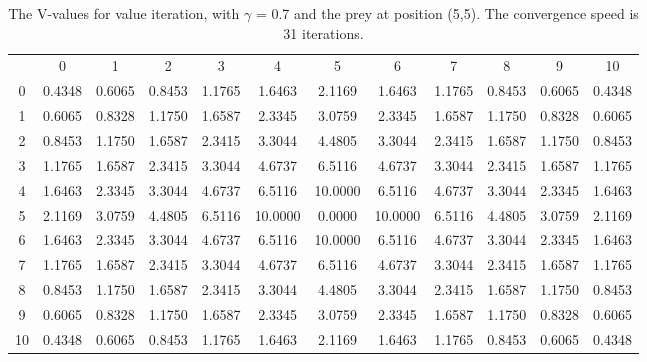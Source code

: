 \documentclass{article}
\begin{document}
\begin{landscape}
\begin{table}[tbp]
\centering
\begin{tabular} {c c c c c c c c c c c c}
 & 0 & 1 & 2 & 3 & 4 & 5 & 6 & 7 & 8 & 9 & 10 \\
0 &  0.4348 &  0.6065 &  0.8453 &  1.1765 &  1.6463 &  2.1169 &  1.6463 &  1.1765 &  0.8453 &  0.6065 &  0.4348\\
1 &  0.6065 &  0.8328 &  1.1750 &  1.6587 &  2.3345 &  3.0759 &  2.3345 &  1.6587 &  1.1750 &  0.8328 &  0.6065\\
2 &  0.8453 &  1.1750 &  1.6587 &  2.3415 &  3.3044 &  4.4805 &  3.3044 &  2.3415 &  1.6587 &  1.1750 &  0.8453\\
3 &  1.1765 &  1.6587 &  2.3415 &  3.3044 &  4.6737 &  6.5116 &  4.6737 &  3.3044 &  2.3415 &  1.6587 &  1.1765\\
4 &  1.6463 &  2.3345 &  3.3044 &  4.6737 &  6.5116 & 10.0000 &  6.5116 &  4.6737 &  3.3044 &  2.3345 &  1.6463\\
5 &  2.1169 &  3.0759 &  4.4805 &  6.5116 & 10.0000 &  0.0000 & 10.0000 &  6.5116 &  4.4805 &  3.0759 &  2.1169\\
6 &  1.6463 &  2.3345 &  3.3044 &  4.6737 &  6.5116 & 10.0000 &  6.5116 &  4.6737 &  3.3044 &  2.3345 &  1.6463\\
7 &  1.1765 &  1.6587 &  2.3415 &  3.3044 &  4.6737 &  6.5116 &  4.6737 &  3.3044 &  2.3415 &  1.6587 &  1.1765\\
8 &  0.8453 &  1.1750 &  1.6587 &  2.3415 &  3.3044 &  4.4805 &  3.3044 &  2.3415 &  1.6587 &  1.1750 &  0.8453\\
9 &  0.6065 &  0.8328 &  1.1750 &  1.6587 &  2.3345 &  3.0759 &  2.3345 &  1.6587 &  1.1750 &  0.8328 &  0.6065\\
10 &  0.4348 &  0.6065 &  0.8453 &  1.1765 &  1.6463 &  2.1169 &  1.6463 &  1.1765 &  0.8453 &  0.6065 &  0.4348\\
\end{tabular}\\
\caption{The V-values for value iteration, with $\gamma$ = 0.7 and the prey at position (5,5). The convergence speed is 31 iterations.}
\label{valueiteration3}
\end{table}


\end{landscape}
\end{document}
